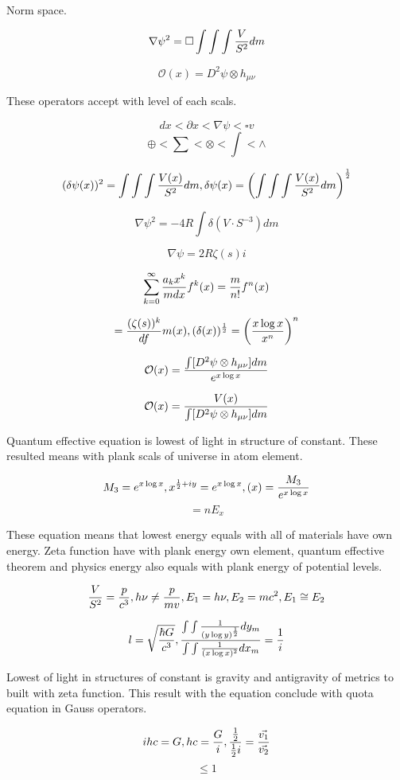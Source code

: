 \documentclass{jsarticle}
\begin{document}
Norm space.

$$ \nabla \psi^2 = \square \int \int \int {V \over S^2}dm $$

$$ \mathcal{O}(x) = D^2 \psi \otimes h_{\mu\nu} $$

These operators accept with level of each scals.

  $$ dx < \partial x < \nabla \psi < \square v $$
  $$ \oplus < \sum < \otimes < \int < \wedge $$

  $$ (\delta \psi(x))^2 = \int \int \int {V(x) \over S^2}dm, \delta \psi(x) = \left(\int \int \int {V(x) \over S^2}dm
  \right)^{1 \over 2} $$

  $$ \nabla \psi^2 = - 4 R \int \delta(V \cdot S^{-3})dm $$

  $$ \nabla \psi = 2 R \zeta(s)i $$

  $$ \sum_{k=0}^{\infty}{a_kx^k \over mdx}f^k(x) = {m \over n!}f^n(x) $$

  $$ = {(\zeta(s))^k \over df}m(x), (\delta(x))^{1 \over 2} = \left({x \log x \over x^n}\right)^n$$

  $$ \mathcal{O}(x) = {\int[D^2 \psi \otimes h_{\mu\nu}]dm \over e^{x \log x}} $$

  $$ \mathcal{O}(x) = {V(x) \over \int[D^2 \psi \otimes h_{\mu\nu}]dm} $$

  
  Quantum effective equation is lowest of light in structure of constant. These resulted means with plank
scals of universe in atom element.  

$$ M_3 = e^{x \log x}, x^{{1 \over 2} + iy} = e^{x \log x}, \mathcal(x) = {M_3 \over e^{x \log x}} $$
$$ = nE_x $$


  These equation means that lowest energy equals with all of materials have own energy. 
Zeta function have with plank energy own element, quantum effective theorem  and physics energy also
equals with plank energy of potential levels.

$$ { V \over S^2} = {p \over c^3},h\nu \neq {p \over mv}, E_1 = h\nu, E_2 = mc^2, E_1 \cong E_2 $$

$$ l = \sqrt{{\hbar G \over c^3}}, {\int \int {{1 \over (y \log y)^{1 \over 2}}}dy_m \over 
	{\int \int {1 \over (x \log x)^2}}dx_m} = {1 \over i} $$

  Lowest of light in structures of constant is gravity and antigravity of metrics to built with zeta function.
This result with the equation conclude with quota equation in Gauss operators.

$$ ihc = G, hc = {G \over i}, {{1 \over 2} \over {1 \over 2}i} = {\vec{v_1} \over \vec{v_2}} $$
$$ \le 1 $$
\end{document}
